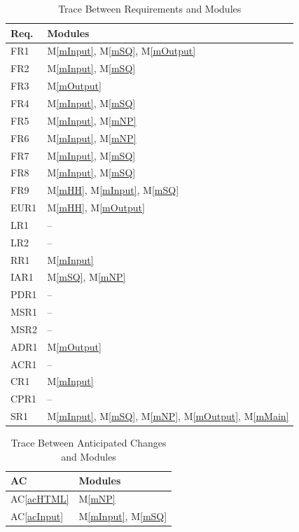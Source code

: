 \documentclass[12pt, titlepage]{article}
\newcommand{\acref}[1]{AC\ref{#1}}
\newcommand{\mref}[1]{M\ref{#1}}
\begin{document}
\begin{table}[H]
\centering
\begin{tabular}{p{} p{}}
\toprule
\textbf{Req.} & \textbf{Modules}\\
\midrule
FR1 & \mref{mInput}, \mref{mSQ}, \mref{mOutput}\\
FR2 & \mref{mInput}, \mref{mSQ}\\
FR3 & \mref{mOutput}\\
FR4 & \mref{mInput}, \mref{mSQ}\\
FR5 & \mref{mInput}, \mref{mNP}\\
FR6 & \mref{mInput}, \mref{mNP}\\
FR7 & \mref{mInput}, \mref{mSQ}\\
FR8 & \mref{mInput}, \mref{mSQ}\\
FR9 & \mref{mHH}, \mref{mInput}, \mref{mSQ}\\
EUR1 & \mref{mHH}, \mref{mOutput}\\
LR1 & --\\
LR2 & --\\
RR1 & \mref{mInput}\\
IAR1 & \mref{mSQ}, \mref{mNP}\\
PDR1 & --\\
MSR1 & --\\
MSR2 & --\\
ADR1 & \mref{mOutput}\\
ACR1 & --\\
CR1 & \mref{mInput}\\
CPR1 & --\\
SR1 & \mref{mInput}, \mref{mSQ}, \mref{mNP}, \mref{mOutput}, \mref{mMain}\\
\bottomrule
\end{tabular}
\caption{Trace Between Requirements and Modules}
\label{TblRT}
\end{table}

\begin{table}[H]
\centering
\begin{tabular}{p{} p{}}
\toprule
\textbf{AC} & \textbf{Modules}\\
\midrule
\acref{acHTML} & \mref{mNP}\\
\acref{acInput} & \mref{mInput}, \mref{mSQ}\\
\bottomrule
\end{tabular}
\caption{Trace Between Anticipated Changes and Modules}
\label{TblACT}
\end{table}
\end{document}
